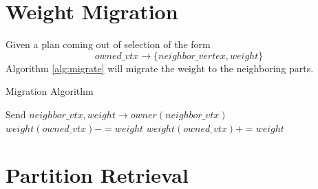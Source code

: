 \documentclass[a4paper]{article}
\begin{document}
{  \section{Weight Migration}
  \label{sec:migrate}

  Given a plan coming out of selection of the form
  $$owned\_vtx \rightarrow \{neighbor\_vertex, weight\}$$
  Algorithm \ref{alg:migrate} will migrate the weight to the neighboring parts.

  \begin{algorithm}
    \caption{Migration Algorithm}
    \label{alg:migrate}
    \small
    \begin{algorithmic}[1]
      \State Send ${neighbor\_vtx,weight} \rightarrow owner(neighbor\_vtx)$
      \State $weight(owned\_vtx) -= weight$
      \EndFor
      \State $weight(owned\_vtx) += weight$
      \EndFor
      \EndProcedure
    \end{algorithmic}
  \end{algorithm}

  \section{Partition Retrieval}
  
}
\end{document}
